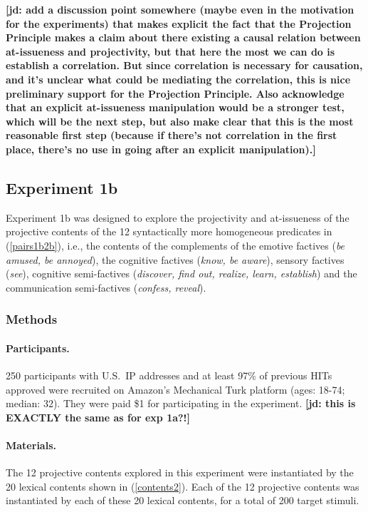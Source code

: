 \documentclass[11pt,fleqn]{article}
\newcommand{\6}{\mbox{$[\hspace*{-.6mm}[$}}
\newcommand{\9}{\mbox{$]\hspace*{-.6mm}]$}}
\newcommand{\jd}[1]{\textbf{\color{Green}[jd: #1]}}
\begin{document}
\jd{add a discussion point somewhere (maybe even in the motivation for the experiments) that makes explicit the fact that the Projection Principle makes a claim about there existing a causal relation between at-issueness and projectivity, but that here the most we can do is establish a correlation. But since correlation is necessary for causation, and it's unclear what could be mediating the correlation, this is nice preliminary support for the Projection Principle. Also acknowledge that an explicit at-issueness manipulation would be a stronger test, which will be the next step, but also make clear that this is the most reasonable first step (because if there's not correlation in the first place, there's no use in going after an explicit manipulation).}

\subsection{Experiment 1b}\label{s-exp1b} 

Experiment 1b was designed to explore the projectivity and at-issueness of the projective contents of the 12 syntactically more homogeneous predicates in (\ref{pairs1b2b}), i.e., the contents of the complements of the emotive factives ({\em be amused, be annoyed}), the cognitive factives ({\em know, be aware}), sensory factives ({\em see}), cognitive semi-factives ({\em discover, find out, realize, learn, establish}) and the communication semi-factives ({\em confess, reveal}).


\subsubsection{Methods}

\paragraph{Participants.} 250 participants with U.S.\ IP addresses and at least 97\% of previous HITs approved were recruited on Amazon's Mechanical Turk platform (ages: 18-74; median: 32). They were paid \$1 for participating in the experiment. \jd{this is EXACTLY the same as for exp 1a?!}

\paragraph{Materials.} The 12 projective contents explored in this experiment were instantiated by the 20 lexical contents shown in (\ref{contents2}). Each of the 12 projective contents was instantiated by each of these 20 lexical contents, for a total of 200 target stimuli. 
\end{document}
